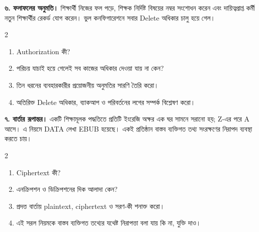 \textbf{৬. ফলাফলের অনুমতি।} শিক্ষার্থী নিজের ফল পড়ে, শিক্ষক নির্দিষ্ট বিষয়ের নম্বর সংশোধন করেন এবং দায়িত্বপ্রাপ্ত কর্মী নতুন শিক্ষার্থীর রেকর্ড যোগ করেন। ভুল কনফিগারেশনে সবার Delete অধিকার চালু হয়ে গেল।
\begin{multicols}{2}
\begin{enumerate}
\item[ক.] \begin{minipage}[t]{\linewidth}Authorization কী?
\end{minipage}
\item[খ.] \begin{minipage}[t]{\linewidth}পরিচয় যাচাই হয়ে গেলেই সব কাজের অধিকার দেওয়া যায় না কেন?
\end{minipage}
\item[গ.] \begin{minipage}[t]{\linewidth}তিন ধরনের ব্যবহারকারীর প্রয়োজনীয় অনুমতির সারণি তৈরি করো।
\end{minipage}
\item[ঘ.] \begin{minipage}[t]{\linewidth}অতিরিক্ত Delete অধিকার, ব্যাকআপ ও পরিবর্তনের লগের সম্পর্ক বিশ্লেষণ করো।
\end{minipage}
\end{enumerate}
\end{multicols}

\textbf{৭. বার্তার রূপান্তর।} একটি শিক্ষামূলক পদ্ধতিতে প্রতিটি ইংরেজি অক্ষর এক ঘর সামনে সরানো হয়; Z-এর পরে A আসে। এ নিয়মে DATA লেখা EBUB হয়েছে। একই প্রতিষ্ঠান বাস্তব ব্যক্তিগত তথ্য সংরক্ষণের নিরাপদ ব্যবস্থা করতে চায়।
\begin{multicols}{2}
\begin{enumerate}
\item[ক.] \begin{minipage}[t]{\linewidth}Ciphertext কী?
\end{minipage}
\item[খ.] \begin{minipage}[t]{\linewidth}এনক্রিপশন ও ডিক্রিপশনের দিক আলাদা কেন?
\end{minipage}
\item[গ.] \begin{minipage}[t]{\linewidth}প্রদত্ত বার্তায় plaintext, ciphertext ও সরণ-কী শনাক্ত করো।
\end{minipage}
\item[ঘ.] \begin{minipage}[t]{\linewidth}এই সরল নিয়মকে বাস্তব ব্যক্তিগত তথ্যের যথেষ্ট নিরাপত্তা বলা যায় কি না, যুক্তি দাও।
\end{minipage}
\end{enumerate}
\end{multicols}

